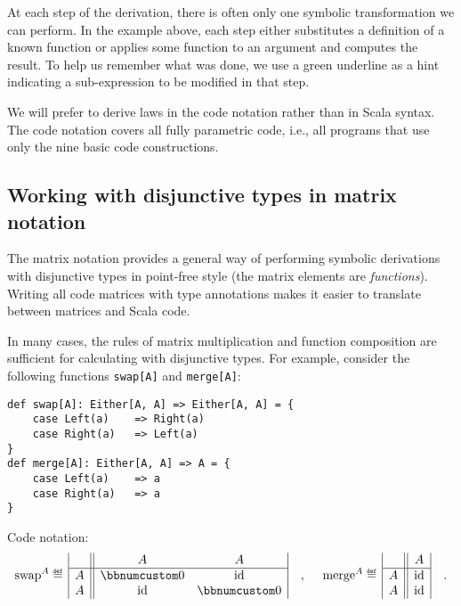 At each step of the derivation, there is often only one symbolic transformation
we can perform. In the example above, each step either substitutes
a definition of a known function or applies some function to an argument
and computes the result. To help us remember what was done, we use
a green underline as a hint indicating a sub-expression to be modified
in that step. 

We will prefer to derive laws in the code notation rather than in
Scala syntax. The code notation covers all fully parametric code,
i.e., all programs that use only the nine basic code constructions.

\subsection{Working with disjunctive types in matrix notation\label{subsec:Working-with-disjunctive-functions}}

The matrix notation provides a general way of performing symbolic
derivations with disjunctive types in point-free style (the matrix
elements are \emph{functions}). Writing all code matrices with type
annotations makes it easier to translate between matrices and Scala
code.

In many cases, the rules of matrix multiplication and function composition
are sufficient for calculating with disjunctive types. For example,
consider the following functions \lstinline!swap[A]! and \lstinline!merge[A]!:
\begin{lstlisting}
def swap[A]: Either[A, A] => Either[A, A] = {
    case Left(a)    => Right(a)
    case Right(a)   => Left(a)
}
def merge[A]: Either[A, A] => A = {
    case Left(a)    => a
    case Right(a)   => a
}
\end{lstlisting}
Code notation:
\[
\text{swap}^{A}\triangleq\,\begin{array}{|c||cc|}
 & A & A\\
\hline A & \bbnum 0 & \text{id}\\
A & \text{id} & \bbnum 0
\end{array}\quad,~\quad\text{merge}^{A}\triangleq\,\begin{array}{|c||c|}
 & A\\
\hline A & \text{id}\\
A & \text{id}
\end{array}\quad.
\]

